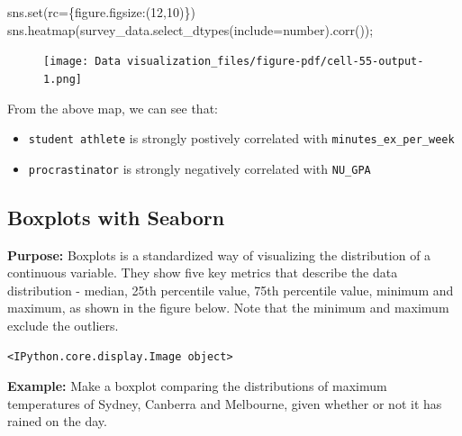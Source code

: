 \documentclass[
  letterpaper,
  DIV=11,
  numbers=noendperiod]{scrreprt}
\newenvironment{Shaded}{\begin{snugshade}}{\end{snugshade}}
\newcommand{\BuiltInTok}[1]{\textcolor[rgb]{0.00,0.23,0.31}{#1}}
\newcommand{\DecValTok}[1]{\textcolor[rgb]{0.68,0.00,0.00}{#1}}
\newcommand{\NormalTok}[1]{\textcolor[rgb]{0.00,0.23,0.31}{#1}}
\newcommand{\OperatorTok}[1]{\textcolor[rgb]{0.37,0.37,0.37}{#1}}
\newcommand{\StringTok}[1]{\textcolor[rgb]{0.13,0.47,0.30}{#1}}
\providecommand{\tightlist}{%
  \setlength{\itemsep}{0pt}\setlength{\parskip}{0pt}}\usepackage{longtable,booktabs,array}
\begin{document}
\begin{Shaded}
\begin{Highlighting}[]
\NormalTok{sns.}\BuiltInTok{set}\NormalTok{(rc}\OperatorTok{=}\NormalTok{\{}\StringTok{\textquotesingle{}figure.figsize\textquotesingle{}}\NormalTok{:(}\DecValTok{12}\NormalTok{,}\DecValTok{10}\NormalTok{)\})}
\NormalTok{sns.heatmap(survey\_data.select\_dtypes(include}\OperatorTok{=}\StringTok{\textquotesingle{}number\textquotesingle{}}\NormalTok{).corr())}\OperatorTok{;}
\end{Highlighting}
\end{Shaded}

\begin{figure}[H]

{\centering \texttt{[image: Data visualization\_files/figure-pdf/cell-55-output-1.png]}

}

\end{figure}

From the above map, we can see that:

\begin{itemize}
\tightlist
\item
  \texttt{student\ athlete} is strongly postively correlated with
  \texttt{minutes\_ex\_per\_week}
\item
  \texttt{procrastinator} is strongly negatively correlated with
  \texttt{NU\_GPA}
\end{itemize}

\hypertarget{boxplots-with-seaborn}{%
\subsection{Boxplots with Seaborn}\label{boxplots-with-seaborn}}

\textbf{Purpose:} Boxplots is a standardized way of visualizing the
distribution of a continuous variable. They show five key metrics that
describe the data distribution - median, 25th percentile value, 75th
percentile value, minimum and maximum, as shown in the figure below.
Note that the minimum and maximum exclude the outliers.

\begin{verbatim}
<IPython.core.display.Image object>
\end{verbatim}

\textbf{Example:} Make a boxplot comparing the distributions of maximum
temperatures of Sydney, Canberra and Melbourne, given whether or not it
has rained on the day.
\end{document}
